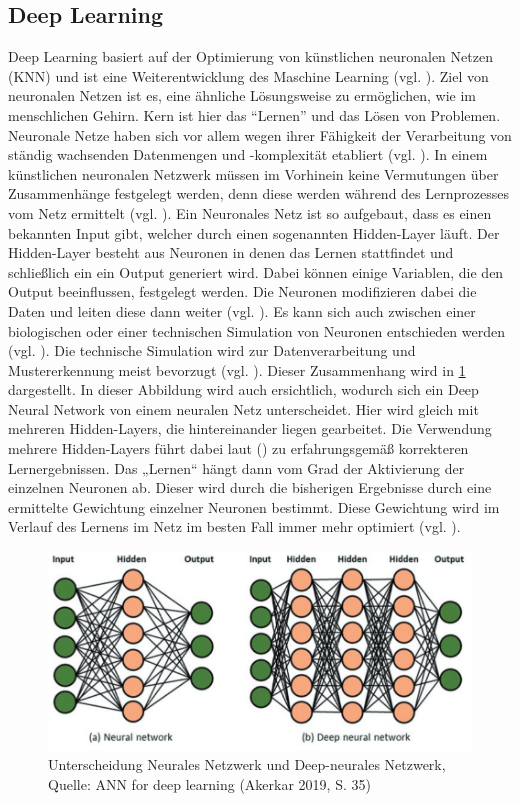 \subsection{Deep Learning}
Deep Learning basiert auf der Optimierung von künstlichen neuronalen Netzen (KNN) und ist eine Weiterentwicklung des Maschine Learning (vgl. \cite[S. 1]{Georgevici.2019}). Ziel von neuronalen Netzen ist es, eine ähnliche Lösungsweise zu ermöglichen, wie im menschlichen Gehirn. Kern ist hier das “Lernen” und das Lösen von Problemen. Neuronale Netze haben sich vor allem wegen ihrer Fähigkeit der Verarbeitung von ständig wachsenden Datenmengen und -komplexität etabliert (vgl. \cite[S. 373]{Welsch.2018}). In einem künstlichen neuronalen Netzwerk müssen im Vorhinein keine Vermutungen über Zusammenhänge festgelegt werden, denn diese werden während des Lernprozesses vom Netz ermittelt (vgl. \cite[S. 581]{Backhaus.2018b}). Ein Neuronales Netz ist 
so aufgebaut, dass es einen bekannten Input gibt, welcher durch einen sogenannten Hidden-Layer läuft. Der Hidden-Layer besteht aus Neuronen in denen das Lernen stattfindet und schließlich ein ein Output generiert wird. Dabei können einige Variablen, die den Output beeinflussen, festgelegt werden. 
Die Neuronen modifizieren dabei die Daten und leiten diese dann weiter (vgl. \cite[S. 373]{Welsch.2018}). Es kann sich auch zwischen einer biologischen oder einer technischen Simulation von Neuronen entschieden werden (vgl. \cite{https:www.facebook.comspektrumverlag.04.12.2014}). Die technische Simulation wird zur Datenverarbeitung und Mustererkennung meist bevorzugt (vgl. \cite{https:www.facebook.comspektrumverlag.04.12.2014}). Dieser Zusammenhang wird in \ref{fig:NeuralVsDeepNeural} dargestellt. 
In dieser Abbildung wird auch ersichtlich, wodurch sich ein Deep Neural Network von einem neuralen Netz unterscheidet. Hier wird gleich mit mehreren Hidden-Layers, die hintereinander liegen gearbeitet. Die Verwendung mehrere Hidden-Layers führt dabei laut (\cite[S. 581]{Backhaus.2018b}) zu erfahrungsgemäß korrekteren Lernergebnissen. Das „Lernen“ hängt dann vom Grad der Aktivierung der einzelnen Neuronen ab. Dieser wird durch die bisherigen Ergebnisse durch eine ermittelte Gewichtung einzelner Neuronen bestimmt. Diese Gewichtung wird im Verlauf des Lernens im Netz im besten Fall immer mehr optimiert (vgl. \cite[S. 586]{Backhaus.2018b}).
\begin{figure}[ht]
\centering
\includegraphics[width=\linewidth]{pics/ANN_for_deep_learning_P35}
\caption{Unterscheidung Neurales Netzwerk und Deep-neurales Netzwerk, Quelle: ANN for deep learning (Akerkar 2019, S. 35)}
\label{fig:NeuralVsDeepNeural}
\end{figure}
